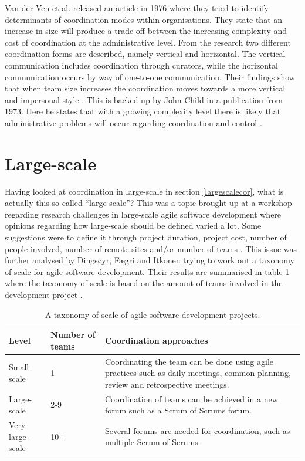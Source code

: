 Van der Ven et al. released an article in 1976 where they tried to identify determinants of coordination modes within organisations. They state that an increase in size will produce a trade-off between the increasing complexity and cost of coordination at the administrative level. From the research two different coordination forms are described, namely vertical and horizontal. The vertical communication includes coordination through curators, while the horizontal communication occurs by way of one-to-one communication. Their findings show that when team size increases the coordination moves towards a more vertical and impersonal style \cite{Ven1976}. This is backed up by John Child in a publication from 1973. Here he states that with a growing complexity level there is likely that administrative problems will occur regarding coordination and control \cite{Child1973}.

\section{Large-scale}

Having looked at coordination in large-scale in section \ref{largescalecor}, what is actually this so-called ``large-scale''? This was a topic brought up at a workshop regarding research challenges in large-scale agile software development where opinions regarding how large-scale should be defined varied a lot. Some suggestions were to define it through project duration, project cost, number of people involved, number of remote sites and/or number of teams \cite{Dingsoyr2013b}. This issue was further analysed by Dingsøyr, Fægri and Itkonen trying to work out a taxonomy of scale for agile software development. Their results are summarised in table \ref{Scale} where the taxonomy of scale is based on the amount of teams involved in the development project \cite{Dingsoyr2013a}.

\begin{table}[H]
\begin{center}
    \begin{tabular}{| l | l | p{7cm} |}
    \hline
    \textbf{Level} & \textbf{Number of teams} & \textbf{Coordination approaches} \\ \hline
    Small-scale & 1 & Coordinating the team can be done using agile practices such as daily meetings, common planning, review and retrospective meetings. \\ \hline
    Large-scale & 2-9 & Coordination of teams can be achieved in a new forum such as a Scrum of Scrums forum. \\ \hline
    Very large-scale & 10+ & Several forums are needed for coordination, such as multiple Scrum of Scrums. \\
    \hline
    \end{tabular}
    \caption{A taxonomy of scale of agile software development projects.}
    \label{Scale}
\end{center}
\end{table}


